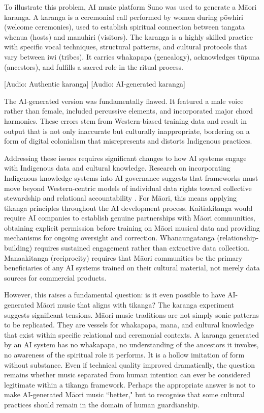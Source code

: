 \documentclass{article}
\begin{document}
To illustrate this problem, AI music platform Suno was used to generate a Māori karanga. A karanga is a ceremonial call performed by women during pōwhiri (welcome ceremonies), used to establish spiritual connection between tangata whenua (hosts) and manuhiri (visitors). The karanga is a highly skilled practice with specific vocal techniques, structural patterns, and cultural protocols that vary between iwi (tribes). It carries whakapapa (genealogy), acknowledges tūpuna (ancestors), and fulfills a sacred role in the ritual process. 

[Audio: Authentic karanga] 
[Audio: AI-generated karanga] 

The AI-generated version was fundamentally flawed. It featured a male voice rather than female, included percussive elements, and incorporated major chord harmonies. These errors stem from Western-biased training data and result in output that is not only inaccurate but culturally inappropriate, bordering on a form of digital colonialism that misrepresents and distorts Indigenous practices.

Addressing these issues requires significant changes to how AI systems engage with Indigenous data and cultural knowledge. Research on incorporating Indigenous knowledge systems into AI governance suggests that frameworks must move beyond Western-centric models of individual data rights toward collective stewardship and relational accountability \cite{ray2024incorporating}. For Māori, this means applying tikanga principles throughout the AI development process. Kaitiakitanga would require AI companies to establish genuine partnerships with Māori communities, obtaining explicit permission before training on Māori musical data and providing mechanisms for ongoing oversight and correction. Whanaungatanga (relationship-building) requires sustained engagement rather than extractive data collection. Manaakitanga (reciprocity) requires that Māori communities be the primary beneficiaries of any AI systems trained on their cultural material, not merely data sources for commercial products. 

However, this raises a fundamental question: is it even possible to have AI-generated Māori music that aligns with tikanga? The karanga experiment suggests significant tensions. Māori music traditions are not simply sonic patterns to be replicated. They are vessels for whakapapa, mana, and cultural knowledge that exist within specific relational and ceremonial contexts. A karanga generated by an AI system has no whakapapa, no understanding of the ancestors it invokes, no awareness of the spiritual role it performs. It is a hollow imitation of form without substance. Even if technical quality improved dramatically, the question remains whether music separated from human intention can ever be considered legitimate within a tikanga framework. Perhaps the appropriate answer is not to make AI-generated Māori music ``better," but to recognise that some cultural practices should remain in the domain of human guardianship.
\end{document}
